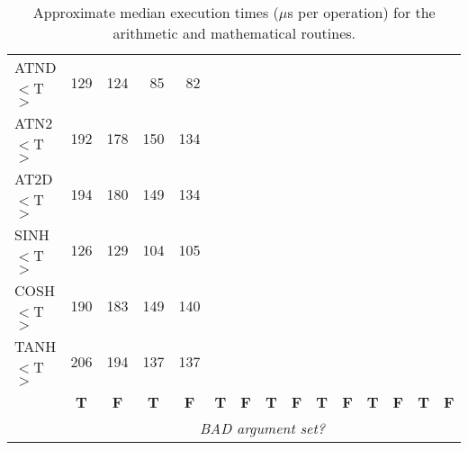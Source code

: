 \begin{table}[h]
\begin{center}
{\begin{tabular}{|l|r|r||r|r||r|r||r|r||r|r||r|r||r|r|}
ATND$<$T$>$ &  129 &  124 &   85 &   82 &      &      &      &      &      &      &      &      &      &      \\
ATN2$<$T$>$ &  192 &  178 &  150 &  134 &      &      &      &      &      &      &      &      &      &      \\
AT2D$<$T$>$ &  194 &  180 &  149 &  134 &      &      &      &      &      &      &      &      &      &      \\
SINH$<$T$>$ &  126 &  129 &  104 &  105 &      &      &      &      &      &      &      &      &      &      \\
COSH$<$T$>$ &  190 &  183 &  149 &  140 &      &      &      &      &      &      &      &      &      &      \\
TANH$<$T$>$ &  206 &  194 &  137 &  137 &      &      &      &      &      &      &      &      &      &      \\
\hline
\multicolumn{1}{c}{} &
\multicolumn{1}{|c}{\bf T} & \multicolumn{1}{|c||}{\bf F} &
\multicolumn{1}{c}{\bf T} & \multicolumn{1}{|c||}{\bf F} &
\multicolumn{1}{c}{\bf T} & \multicolumn{1}{|c||}{\bf F} &
\multicolumn{1}{c}{\bf T} & \multicolumn{1}{|c||}{\bf F} &
\multicolumn{1}{c}{\bf T} & \multicolumn{1}{|c||}{\bf F} &
\multicolumn{1}{c}{\bf T} & \multicolumn{1}{|c||}{\bf F} &
\multicolumn{1}{c}{\bf T} & \multicolumn{1}{|c|}{\bf F}\\
\cline{2-15}
\multicolumn{1}{c}{} &
\multicolumn{14}{|c|}{\em BAD argument set?}\\
\cline{2-15}
\end{tabular}
}
\caption{Approximate median execution times ($\mu$s per operation) for the
 arithmetic and mathematical routines.}
\label{table:vecstats}
\end{center}
\end{table}

\newpage

